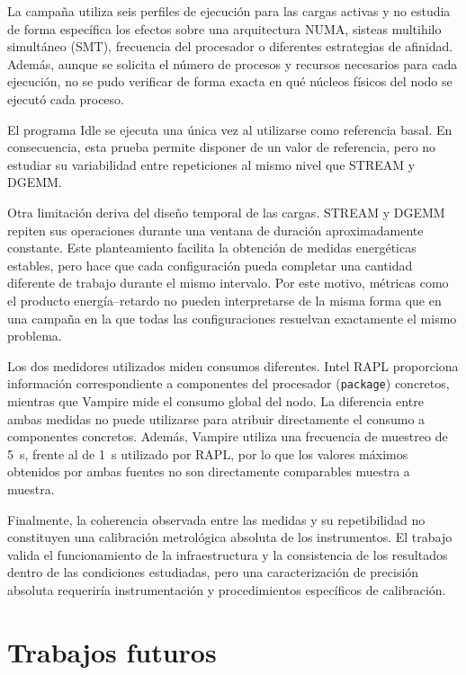 La campaña utiliza seis perfiles de ejecución para las cargas activas y no estudia de forma específica los efectos sobre una arquitectura NUMA, sisteas multihilo simultáneo (SMT), frecuencia del procesador o diferentes estrategias de afinidad. Además, aunque se solicita el número de procesos y recursos necesarios para cada ejecución, no se pudo verificar de forma exacta en qué núcleos físicos del nodo se ejecutó cada proceso.

El programa Idle se ejecuta una única vez al utilizarse como referencia basal. En consecuencia, esta prueba permite disponer de un valor de referencia, pero no estudiar su variabilidad entre repeticiones al mismo nivel que STREAM y DGEMM.

Otra limitación deriva del diseño temporal de las cargas. STREAM y DGEMM repiten sus operaciones durante una ventana de duración aproximadamente constante. Este planteamiento facilita la obtención de medidas energéticas estables, pero hace que cada configuración pueda completar una cantidad diferente de trabajo durante el mismo intervalo. Por este motivo, métricas como el producto energía--retardo no pueden interpretarse de la misma forma que en una campaña en la que todas las configuraciones resuelvan exactamente el mismo problema.

Los dos medidores utilizados miden consumos diferentes. Intel RAPL proporciona información correspondiente a componentes del procesador (\texttt{package}) concretos, mientras que Vampire mide el consumo global del nodo. La diferencia entre ambas medidas no puede utilizarse para atribuir directamente el consumo a componentes concretos. Además, Vampire utiliza una frecuencia de muestreo de 5~s, frente al de 1~s utilizado por RAPL, por lo que los valores máximos obtenidos por ambas fuentes no son directamente comparables muestra a muestra.

Finalmente, la coherencia observada entre las medidas y su repetibilidad no constituyen una calibración metrológica absoluta de los instrumentos. El trabajo valida el funcionamiento de la infraestructura y la consistencia de los resultados dentro de las condiciones estudiadas, pero una caracterización de precisión absoluta requeriría instrumentación y procedimientos específicos de calibración.

\section{Trabajos futuros}
\label{sec:trabajo-futuro}

